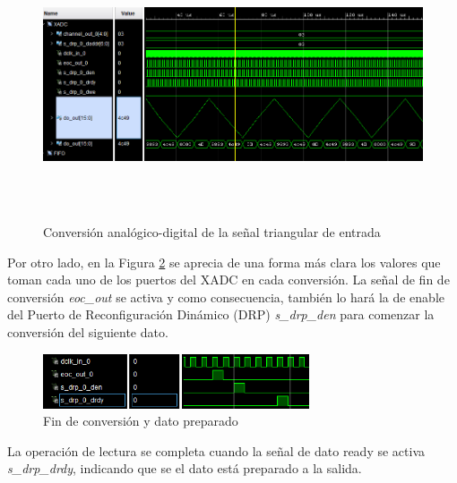 \begin{figure}[h]
    \centering
    \includegraphics[width=1\textwidth, height=8cm]{img/simu/xadc.PNG}
    \caption{Conversión analógico-digital de la señal triangular de entrada}
    \label{fig:xadc}
\end{figure}

\vspace{3mm}
\pagebreak

Por otro lado, en la Figura \ref{fig:xadc2} se aprecia de una forma más clara los valores que toman cada uno de los puertos del XADC en cada conversión. La señal de fin de conversión \textit{eoc\_out} se activa y como consecuencia, también lo hará la de enable del Puerto de Reconfiguración Dinámico (DRP) \textit{s\_drp\_den} para comenzar la conversión del siguiente dato. 

\vspace{3mm}

\begin{figure}[h]
    \centering
    \includegraphics[width=0.7\textwidth]{img/simu/xadc2.PNG}
    \caption{Fin de conversión y dato preparado}
    \label{fig:xadc2}
\end{figure}

\vspace{3mm}

La operación de lectura se completa cuando la señal de dato ready se activa \textit{s\_drp\_drdy}, indicando que se el dato está preparado a la salida.

\vspace{3mm}

